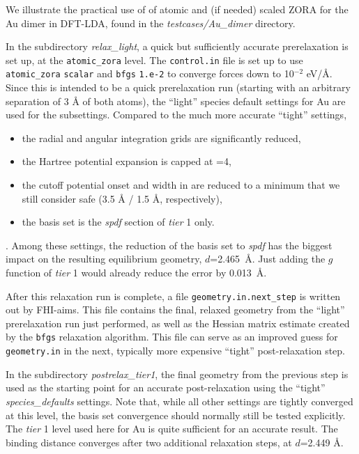 We illustrate the practical use of of atomic and (if needed) scaled ZORA for the
Au dimer in DFT-LDA, found in the \emph{testcases/Au\_dimer}
directory. 

In the subdirectory \emph{relax\_light}, a quick but
sufficiently accurate prerelaxation is set up, at the \texttt{atomic\_zora}
level. The \texttt{control.in}
file is set up to use  \texttt{atomic\_zora}
\texttt{scalar} and  \texttt{bfgs}
\texttt{1.e-2} to converge forces down to 10$^{-2}$ eV/{\AA}. Since
this is intended to be a quick prerelaxation run (starting with an
arbitrary separation of 3 {\AA} of both atoms), the ``light'' species 
default settings for Au are used for the 
subsettings. Compared to the much more accurate ``tight'' settings,
\begin{itemize}
\item the radial and angular integration grids are significantly reduced, 
\item the Hartree potential expansion is capped at
  =4,
\item the cutoff potential onset and width in 
  are reduced to a minimum that we still consider safe (3.5 {\AA} / 1.5 {\AA},
  respectively),
\item the basis set is the \emph{spdf} section of \emph{tier} 1 only.
\end{itemize}.
Among these settings, the reduction of the basis set to \emph{spdf} has the
biggest impact on the resulting equilibrium geometry, $d$=2.465~{\AA}. Just
adding the $g$ function of \emph{tier} 1 would already reduce the error by
0.013~{\AA}.  

After this relaxation run is complete, a file \texttt{geometry.in.next\_step} is
written out by FHI-aims. This file contains the final, relaxed geometry from
the ``light'' prerelaxation run just performed, as well as the Hessian matrix
estimate created by the  \texttt{bfgs} relaxation algorithm.
This file can serve as an improved guess for \texttt{geometry.in} in the next, 
typically more expensive ``tight'' post-relaxation step. 

In the subdirectory \emph{postrelax\_tier1}, the final geometry from the 
previous step is used as the starting point for an accurate post-relaxation
using the ``tight'' \emph{species\_defaults} settings. Note that,
while all other settings are tightly converged at this level, the basis set
convergence should normally still be tested explicitly. The \emph{tier} 1
level used here for Au is quite sufficient for an accurate result. The binding
distance converges after two additional relaxation steps, at $d$=2.449 {\AA}.

